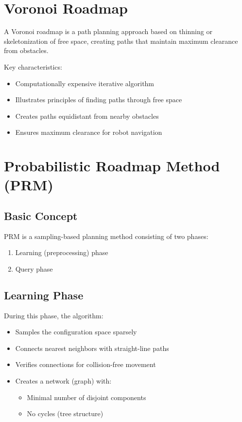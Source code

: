 \documentclass[openany]{book}
\theoremstyle{definition}
\theoremstyle{remark}
\newcommand{\definitionbox}[1]{
\begin{tcolorbox}[colback=blue!5,colframe=blue!40!black,title=Definition]
 #1
\end{tcolorbox}
}
\begin{document}
\section{Voronoi Roadmap}

\definitionbox{A Voronoi roadmap is a path planning approach based on thinning or skeletonization of free space, creating paths that maintain maximum clearance from obstacles.}

Key characteristics:
\begin{itemize}
   \item Computationally expensive iterative algorithm
   \item Illustrates principles of finding paths through free space
   \item Creates paths equidistant from nearby obstacles
   \item Ensures maximum clearance for robot navigation
\end{itemize}

\section{Probabilistic Roadmap Method (PRM)}

\subsection{Basic Concept}
PRM is a sampling-based planning method consisting of two phases:
\begin{enumerate}
   \item Learning (preprocessing) phase
   \item Query phase
\end{enumerate}

\subsection{Learning Phase}
During this phase, the algorithm:
\begin{itemize}
   \item Samples the configuration space sparsely
   \item Connects nearest neighbors with straight-line paths
   \item Verifies connections for collision-free movement
   \item Creates a network (graph) with:
   \begin{itemize}
       \item Minimal number of disjoint components
       \item No cycles (tree structure)
   \end{itemize}
\end{itemize}
\end{document}
